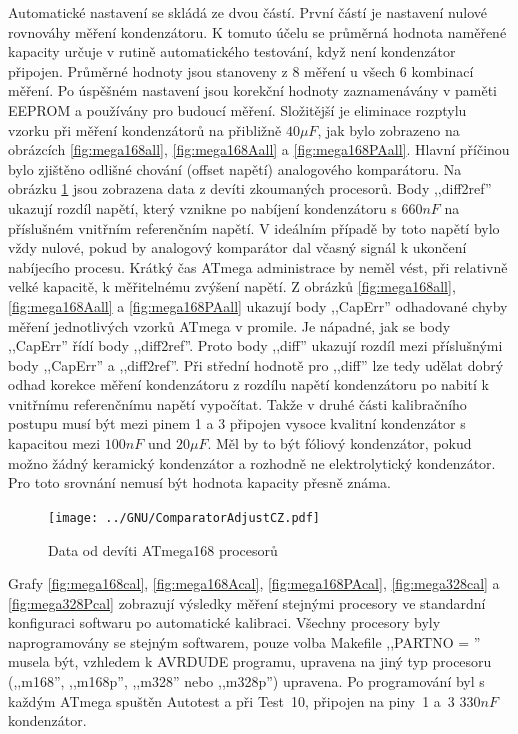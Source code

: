 Automatické nastavení se skládá ze dvou částí.
První částí je nastavení nulové rovnováhy měření kondenzátoru.
K tomuto účelu se průměrná hodnota naměřené kapacity určuje v rutině automatického testování, když není kondenzátor připojen.
Průměrné hodnoty jsou stanoveny z 8 měření u všech 6 kombinací měření.
Po úspěšném nastavení jsou korekční hodnoty zaznamenávány v paměti EEPROM a používány pro budoucí měření.
Složitější je eliminace rozptylu vzorku při měření kondenzátorů na přibližně \(40\mu F\),
jak bylo zobrazeno na obrázcích \ref{fig:mega168all}, \ref{fig:mega168Aall} a \ref{fig:mega168PAall}.
Hlavní příčinou bylo zjištěno odlišné chování (offset napětí) analogového komparátoru.
Na obrázku \ref{fig:CompAdjust} jsou zobrazena data z devíti zkoumaných procesorů.
Body ,,diff2ref'' ukazují rozdíl napětí, který vznikne po nabíjení kondenzátoru s \(660nF\) na
příslušném vnitřním referenčním napětí.
V ideálním případě by toto napětí bylo vždy nulové, pokud by analogový komparátor dal
včasný signál k ukončení nabíjecího procesu.
Krátký čas  ATmega administrace by neměl vést, při relativně velké kapacitě, k měřitelnému zvýšení napětí.
Z obrázků \ref{fig:mega168all}, \ref{fig:mega168Aall} a \ref{fig:mega168PAall} ukazují body ,,CapErr'' 
odhadované chyby měření jednotlivých vzorků ATmega v promile.
Je nápadné, jak se body ,,CapErr'' řídí body ,,diff2ref''.
Proto body ,,diff''  ukazují rozdíl mezi příslušnými body ,,CapErr'' a ,,diff2ref''.
Při střední hodnotě pro ,,diff'' lze tedy udělat dobrý odhad korekce měření kondenzátoru z rozdílu
napětí kondenzátoru po nabití k vnitřnímu referenčnímu napětí vypočítat.
Takže v druhé části kalibračního postupu musí být mezi pinem 1 a 3 připojen vysoce kvalitní
kondenzátor s kapacitou mezi \(100nF\) und \(20\mu F\).
Měl by to být fóliový kondenzátor, pokud možno žádný keramický kondenzátor a rozhodně ne
elektrolytický kondenzátor.
Pro toto srovnání nemusí být hodnota kapacity  přesně známa.

\begin{figure}[H]
\centering
\texttt{[image: ../GNU/ComparatorAdjustCZ.pdf]}
\caption{Data od devíti ATmega168 procesorů}
\label{fig:CompAdjust}
\end{figure}

Grafy \ref{fig:mega168cal}, \ref{fig:mega168Acal}, \ref{fig:mega168PAcal},  \ref{fig:mega328cal} a
\ref{fig:mega328Pcal} zobrazují výsledky měření stejnými procesory ve standardní konfiguraci
softwaru po automatické kalibraci.
Všechny procesory byly naprogramovány se stejným softwarem, pouze volba
Makefile ,,PARTNO = '' musela být, vzhledem k AVRDUDE programu,
upravena na jiný typ procesoru (,,m168'', ,,m168p'', ,,m328'' nebo ,,m328p'') upravena.
Po programování byl s každým ATmega spuštěn Autotest a při Test~10, připojen na piny~1 a~3 \(330nF\) kondenzátor.

